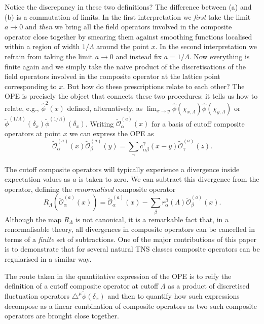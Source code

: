 \documentclass[prl,twocolumn,lengthcheck,superscriptaddress]{revtex4-1}
\theoremstyle{definition}
\theoremstyle{remark}
\begin{document}
Notice the discrepancy in these two definitions? The difference between (a) and (b) is a commutation of limits. In the first interpretation we \emph{first} take the limit $a\rightarrow 0$ and \emph{then} we bring all the field operators involved in the composite operator close together by smearing them against smoothing functions localised within a region of width $1/\Lambda$ around the point $x$. In the second interpretation we refrain from taking the limit $a\rightarrow 0$ and instead fix $a= 1/\Lambda$. Now everything is finite again and we simply take the naive product of the discretisations of the field operators involved in the composite operator at the lattice point corresponding to $x$. But how do these prescriptions relate to each other? The OPE is precisely the object that connects these two procedures: it tells us how to relate, e.g., $\widehat{\phi}^2(x)$ defined, alternatively, as $\lim_{x\rightarrow y} \widehat{\phi}(\chi_{x,\Lambda})\widehat{\phi}(\chi_{y,\Lambda})$ or $\widetilde{\phi}^{(1/\Lambda)}(\delta_x)\widetilde{\phi}^{(1/\Lambda)}(\delta_x)$. Writing $\widetilde{\mathcal{O}}^{(a)}_\alpha(x)$ for a basis of cutoff composite operators at point $x$ we can express the OPE as
\begin{equation}
	\widetilde{\mathcal{O}}^{(a)}_\alpha(x)\widetilde{\mathcal{O}}^{(a)}_\beta(y) = \sum_{\gamma} c_{\alpha\beta}^\gamma(x-y) \widetilde{\mathcal{O}}^{(a)}_\gamma(z).
\end{equation}

The cutoff composite operators will typically experience a divergence inside expectation values as $a$ is taken to zero. We can subtract this divergence from the operator, defining the \emph{renormalised} composite operator
\begin{equation}
	R_\Lambda(\widetilde{\mathcal{O}}^{(a)}_\alpha(x)) = \widetilde{\mathcal{O}}^{(a)}_\alpha(x) - \sum_{\beta} r_\alpha^\beta(\Lambda) \widetilde{\mathcal{O}}^{(a)}_\beta(x).
\end{equation}
Although the map $R_\Lambda$ is not canonical, it is a remarkable fact that, in a renormalisable theory, all divergences in composite operators can be cancelled in terms of a \emph{finite} set of subtractions. One of the major contributions of this paper is to demonstrate that for several natural TNS classes composite operators can be regularised in a similar way.

The route taken in the quantitative expression of the OPE is to reify the definition of a cutoff composite operator at cutoff $\Lambda$ as a product of discretised fluctuation operators $\triangle^\mu \widetilde{\phi}(\delta_x)$ and then to quantify how such expressions decompose as a linear combination of composite operators as two such composite operators are brought close together. 
\end{document}
